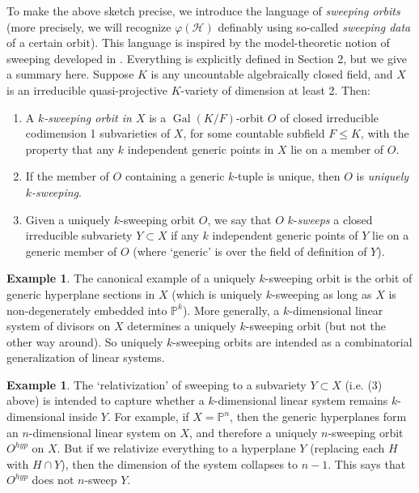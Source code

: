 \documentclass{amsart}
\theoremstyle{definition}
\newtheorem{example}[theorem]{Example}
\begin{document}
To make the above sketch precise, we introduce the language of \textit{sweeping orbits} (more precisely, we will recognize $\varphi(\mathcal H)$ definably using so-called \textit{sweeping data} of a certain orbit). This language is inspired by the model-theoretic notion of sweeping developed in \cite[Section 5]{CasHasVA}. Everything is explicitly defined in Section 2, but we give a summary here. Suppose $K$ is any uncountable algebraically closed field, and $X$ is an irreducible quasi-projective $K$-variety of dimension at least 2. Then:

\begin{enumerate}
    \item A \textit{$k$-sweeping orbit in $X$} is a $\operatorname{Gal}(K/F)$-orbit $O$ of closed irreducible codimension 1 subvarieties of $X$, for some countable subfield $F\leq K$, with the property that any $k$ independent generic points in $X$ lie on a member of $O$.
    \item If the member of $O$ containing a generic $k$-tuple is unique, then $O$ is \textit{uniquely $k$-sweeping}.
    \item Given a uniquely $k$-sweeping orbit $O$, we say that $O$ $k$-\textit{sweeps} a closed irreducible subvariety $Y\subset X$ if any $k$ independent generic points of $Y$ lie on a generic member of $O$ (where `generic' is over the field of definition of $Y$).
\end{enumerate}

\begin{example}\label{E: intro ex sweeping} The canonical example of a uniquely $k$-sweeping orbit is the orbit of generic hyperplane sections in $X$ (which is uniquely $k$-sweeping as long as $X$ is non-degenerately embedded into $\mathbb P^k$). More generally, a $k$-dimensional linear system of divisors on $X$ determines a uniquely $k$-sweeping orbit (but not the other way around). So uniquely $k$-sweeping orbits are intended as a combinatorial generalization of linear systems.
\end{example}

\begin{example}\label{E: intro ex rel sweeping} The `relativization' of sweeping to a subvariety $Y\subset X$ (i.e. (3) above) is intended to capture whether a $k$-dimensional linear system remains $k$-dimensional inside $Y$. For example, if $X=\mathbb P^n$, then the generic hyperplanes form an $n$-dimensional linear system on $X$, and therefore a uniquely $n$-sweeping orbit $O^{hyp}$ on $X$. But if we relativize everything to a hyperplane $Y$ (replacing each $H$ with $H\cap Y$), then the dimension of the system collapses to $n-1$. This says that $O^{hyp}$ does not $n$-sweep $Y$.
\end{example}
\end{document}
